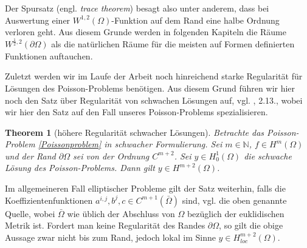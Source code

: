 \documentclass[bibliography=totoc,12pt,a4paper]{scrartcl}
\theoremstyle{exampstyle}
\newtheorem{theorem}[defi]{Theorem}
\numberwithin{equation}{section}
\begin{document}
Der Spursatz (engl. \textit{trace theorem}) besagt also unter anderem, dass bei Auswertung einer $W^{1,2}(\Omega)$-Funktion auf dem Rand eine halbe Ordnung verloren geht. Aus diesem Grunde werden in folgenden Kapiteln die Räume $W^{\frac{1}{2},2}(\partial \Omega)$ als die natürlichen Räume für die meisten auf Formen definierten Funktionen auftauchen.

Zuletzt werden wir im Laufe der Arbeit noch hinreichend starke Regularität für Lösungen des Poisson-Problems benötigen. Aus diesem Grund führen wir hier noch den Satz über Regularität von schwachen Lösungen auf, vgl. \cite{shape_space}, 2.13., wobei wir hier den Satz auf den Fall unseres Poisson-Problems spezialisieren.

\begin{theorem}[höhere Regularität schwacher Lösungen]
	Betrachte das Poisson-Problem \ref{Poissonproblem} in schwacher Formulierung. 
	Sei $m\in\mathbb{N}$, $f\in H^m(\Omega)$ und der Rand $\partial\Omega$ sei von der Ordnung $C^{m+2}$. Sei $y\in H^1_0(\Omega)$ die schwache Lösung des Poisson-Problems. Dann gilt $y\in H^{m+2}(\Omega)$.
\end{theorem}

Im allgemeineren Fall elliptischer Probleme gilt der Satz weiterhin, falls die Koeffizientenfunktionen $a^{i,j}, b^j, c\in C^{m+1}(\bar{\Omega})$ sind, vgl. die oben genannte Quelle, wobei $\bar{\Omega}$ wie üblich der Abschluss von $\Omega$ bezüglich der euklidischen Metrik ist. Fordert man keine Regularität des Randes $\partial\Omega$, so gilt die obige Aussage zwar nicht bis zum Rand, jedoch lokal im Sinne $y\in H^{m+2}_{loc}(\Omega)$.
\newpage
\nocite{*}


\end{document}
